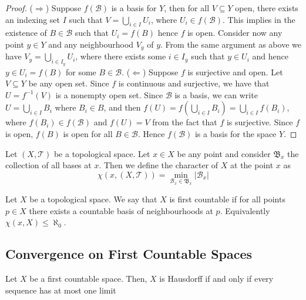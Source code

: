 \begin{proof}
  (\(\Rightarrow\)) Suppose \(f(\mathcal B)\) is a basis for \(Y\), then for all
  \(V \subseteq Y\) open, there exists an indexing set \(I\) such that \(V =
  \bigcup_{i \in  I} U_i\), where \(U_i \in f(\mathcal B)\). This implies in the
  existence of \(B \in \mathcal B\) such that \(U_i = f(B)\) hence \(f\) is
  open. Consider now any point \(y \in Y\) and any neighbourhood \(V_y\) of
  \(y\). From the same argument as above we have \(V_y = \bigcup_{i \in  I_y}
  U_i\), where there exists some \(i \in I_y\) such that \(y \in U_i\) and hence
  \(y \in U_i = f(B)\) for some \(B \in \mathcal B\).
  (\(\Leftarrow\)) Suppose \(f\) is surjective and open. Let \(V \subseteq Y\)
  be any open set. Since \(f\) is continuous and surjective, we have that
  \(U = f^{-1}(V)\) is a nonempty open set. Since \(\mathcal B\) is a basis, we
  can write \(U = \bigcup_{i \in  I} B_i\) where \(B_i \in B\), and then \(f(U)
  = f\left( \bigcup_{i \in  I} B_i \right) = \bigcup_{i \in I} f(B_i)\), where
  \(f(B_i) \in f(\mathcal B)\) and \(f(U) = V\) from the fact that \(f\) is
  surjective. Since \(f\) is open, \(f(B)\) is open for all \(B \in \mathcal
  B\). Hence \(f(\mathcal B)\) is a basis for the space \(Y\).
\end{proof}

\begin{definition}\label{def: character}
  Let \((X, \mathcal T)\) be a topological space. Let \(x \in X\) be any point
  and consider \(\mathfrak B_x\) the collection of all bases at \(x\). Then we
  define the character of \(X\) at the point \(x\) as
  \[
    \chi(x, (X, \mathcal T)) = \min_{\mathcal B_x \in \mathfrak B_x} |\mathcal
    B_x|
  \] 
\end{definition}

\begin{definition}\label{def: first countable}
  Let \(X\) be a topological space. We say that \(X\) is first countable if for
  all points \(p \in X\) there exists a countable basis of neighbourhoods at
  \(p\). Equivalently \(\chi(x, X) \leq \aleph_0\).
\end{definition}

\subsection{Convergence on First Countable Spaces}

\begin{proposition}
  Let \(X\) be a first countable space. Then, \(X\) is Hausdorff if and only if
  every sequence has at most one limit
\end{proposition}


